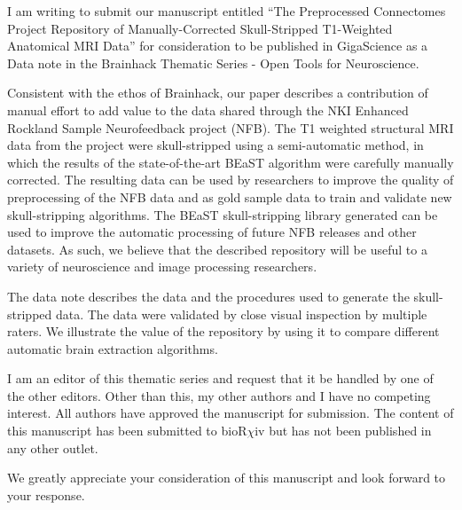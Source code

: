 \documentclass{article}
\begin{document}
\sffamily

I am writing to submit our manuscript entitled ``The Preprocessed Connectomes Project Repository of Manually-Corrected Skull-Stripped T1-Weighted Anatomical MRI Data'' for consideration to be published in GigaScience as a Data note in the Brainhack Thematic Series - Open Tools for Neuroscience.

Consistent with the ethos of Brainhack, our paper describes a contribution of manual effort to add value to the data shared through the NKI Enhanced Rockland Sample Neurofeedback project (NFB). The T1 weighted structural MRI data from the project were skull-stripped using a semi-automatic method, in which the results of the state-of-the-art BEaST algorithm were carefully manually corrected. The resulting data can be used by researchers to improve the quality of preprocessing of the NFB data and as gold sample data to train and validate new skull-stripping algorithms. The BEaST skull-stripping library generated can be used to improve the automatic processing of future NFB releases and other datasets. As such, we believe that the described repository will be useful to a variety of neuroscience and image processing researchers.

The data note describes the data and the procedures used to generate the skull-stripped data. The data were validated by close visual inspection by multiple raters. We illustrate the value of the repository by using it to compare different automatic brain extraction algorithms. 

I am an editor of this thematic series and request that it be handled by one of the other editors. Other than this, my other authors and I have no competing interest. All authors have approved the manuscript for submission. The content of this manuscript has been submitted to bioR$\chi$iv but has not been published in any other outlet.

We greatly appreciate your consideration of this manuscript and look forward to your response.
\end{document}
